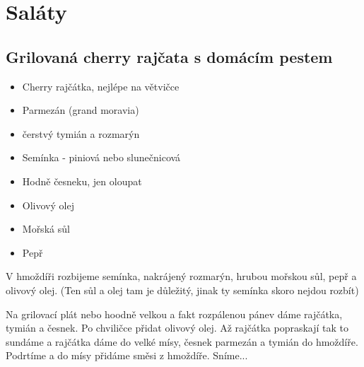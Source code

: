\documentclass[10pt,a4paper]{article}
\newenvironment{myitemize}
{ \begin{itemize}
    \setlength{\itemsep}{0pt}
    \setlength{\parskip}{0pt}
    \setlength{\parsep}{0pt}     }
{ \end{itemize}                  }
\begin{document}
\section{Saláty}
\subsection{Grilovaná cherry rajčata s domácím pestem}
\begin{minipage}[t]{0,5\textwidth}
\begin{myitemize} 
\item Cherry rajčátka, nejlépe na větvičce
\item Parmezán (grand moravia)
\item čerstvý tymián a rozmarýn
\item Semínka - piniová nebo slunečnicová
\item Hodně česneku, jen oloupat
\item Olivový olej
\item Mořská sůl
\item Pepř
\end{myitemize}
\end{minipage}
\begin{minipage}[t]{0,5\textwidth}
V hmoždíři rozbijeme semínka, nakrájený rozmarýn, hrubou mořskou sůl, pepř a olivový olej. (Ten sůl a olej tam je důležitý, jinak ty semínka skoro nejdou rozbít)

Na grilovací plát nebo hoodně velkou a fakt rozpálenou pánev dáme rajčátka, tymián a česnek. Po chviličce přidat olivový olej. Až rajčátka popraskají tak to sundáme a rajčátka dáme do velké mísy, česnek parmezán a tymián do hmoždíře. Podrtíme a do mísy přidáme směsi z hmoždíře. Sníme...
\end{minipage}
\end{document}
